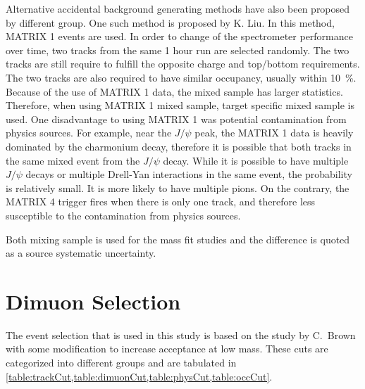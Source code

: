 \documentclass[../main.tex]{subfiles}
\begin{document}
Alternative accidental background generating methods have also been proposed by different group.
One such method is proposed by K. Liu. In this method, MATRIX 1 events are used. In order to 
change of the spectrometer performance over time, two tracks from the same 1 hour run are selected 
randomly. The two tracks are still require to fulfill the opposite charge and top/bottom requirements. 
The two tracks are also required to have similar occupancy, usually within \SI{10}{\percent}.
Because of the use of MATRIX 1 data, the mixed sample has larger statistics. Therefore, when
using MATRIX 1 mixed sample, target specific mixed sample is used. One disadvantage to using MATRIX 1
was potential contamination from physics sources. For example, near the $J/\psi$ peak, the MATRIX 1
data is heavily dominated by the charmonium decay, therefore it is possible that both tracks in the same
mixed event from the $J/\psi$ decay. While it is possible to have multiple $J/\psi$ decays or multiple Drell-Yan
interactions in the same event, the probability is relatively small. It is more likely to have multiple pions.
On the contrary, the MATRIX 4 trigger fires when there is only one track, and therefore less
susceptible to the contamination from physics sources.

Both mixing sample is used for the mass fit studies and the difference is quoted as a source systematic
uncertainty.

\section{Dimuon Selection}
The event selection that is used in this study is based on the study by C.~Brown
\cite{chuck-2111} with some modification to increase acceptance at low mass. These cuts
are categorized into different groups and are tabulated in \cref{table:trackCut,table:dimuonCut,table:physCut,table:occCut}.
\end{document}
